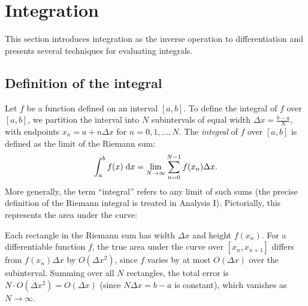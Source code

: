 \documentclass[a4paper]{article}
\begin{document}
\section{Integration}
This section introduces integration as the inverse operation to differentiation and presents several techniques for evaluating integrals.

\subsection{Definition of the integral}
\begin{defi}[Integral]
  Let $f$ be a function defined on an interval $[a, b]$. To define the integral of $f$ over $[a, b]$, we partition the interval into $N$ subintervals of equal width $\Delta x = \frac{b-a}{N}$, with endpoints $x_n = a + n\Delta x$ for $n = 0, 1, \ldots, N$. The \emph{integral} of $f$ over $[a, b]$ is defined as the limit of the Riemann sum:
  \[
    \int_a^b f(x) \;\mathrm{d} x = \lim_{N\to\infty}\sum_{n=0}^{N-1} f(x_n)\Delta x.
  \]
  More generally, the term ``integral'' refers to any limit of such sums (the precise definition of the Riemann integral is treated in Analysis I). Pictorially, this represents the area under the curve:
  \begin{center}
  \end{center}
\end{defi}

\begin{remark}
  Each rectangle in the Riemann sum has width $\Delta x$ and height $f(x_n)$. For a differentiable function $f$, the true area under the curve over $[x_n, x_{n+1}]$ differs from $f(x_n)\Delta x$ by $O(\Delta x^2)$, since $f$ varies by at most $O(\Delta x)$ over the subinterval. Summing over all $N$ rectangles, the total error is $N \cdot O(\Delta x^2) = O(\Delta x)$ (since $N\Delta x = b - a$ is constant), which vanishes as $N \to \infty$.
\end{remark}
\end{document}

